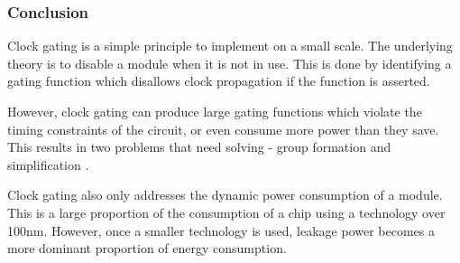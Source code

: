 \subsubsection{Conclusion}

Clock gating is a simple principle to implement on a small scale.
The underlying theory is to disable a module when it is not in use.
This is done by identifying a gating function which disallows clock propagation if the function is asserted.

However, clock gating can produce large gating functions which violate the timing constraints of the circuit, or even consume more power than they save. This results in two problems that need solving - group formation and simplification \cite{han2012synthesis, paik2012clock}.

Clock gating also only addresses the dynamic power consumption of a module. 
This is a large proportion of the consumption of a chip using a technology over 100nm. 
However, once a smaller technology is used, leakage power becomes a more dominant proportion of energy consumption. 





